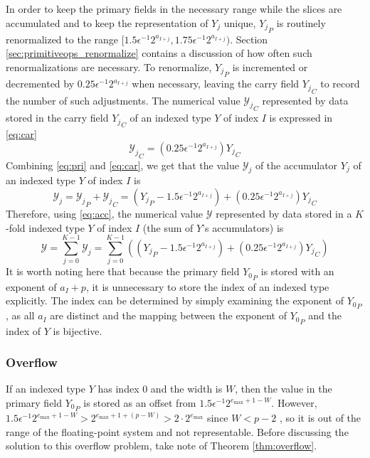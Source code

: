 \documentclass[12pt]{article}
\providecommand{\max}{\ensuremath{\text{max}}}
\theoremstyle{definition}
\numberwithin{equation}{section}
\numberwithin{figure}{section}
\begin{document}
      In order to keep the primary fields in the necessary range while the slices are accumulated and to keep the representation of $Y_j$ unique, ${Y_j}_P$ is routinely renormalized to the range $[1.5 \epsilon^{-1} 2^{a_{I + j}}, 1.75 \epsilon^{-1} 2^{a_{I + j}})$. Section \ref{sec:primitiveops_renormalize} contains a discussion of how often such renormalizations are necessary.
      To renormalize, ${Y_j}_P$ is incremented or decremented by $0.25 \epsilon^{-1} 2^{a_{I + j}}$ when necessary, leaving the carry field ${Y_j}_C$ to record the number of such adjustments.
      The numerical value ${\mathcal{Y}_j}_C$ represented by data stored in the carry field ${Y_j}_C$ of an indexed type $Y$ of index $I$ is expressed in \eqref{eq:car}
      \begin{equation}
        {\mathcal{Y}_j}_C = (0.25\epsilon^{-1}2^{a_{I + j}}){Y_j}_C
        \label{eq:car}
      \end{equation}
      Combining \eqref{eq:pri} and \eqref{eq:car}, we get that the value $\mathcal{Y}_j$ of the accumulator $Y_j$ of an indexed type $Y$ of index $I$ is
      \begin{equation}
        \mathcal{Y}_j = {\mathcal{Y}_j}_P + {\mathcal{Y}_j}_C = ({Y_j}_P - 1.5 \epsilon^{-1}2^{a_{I + j}}) + (0.25\epsilon^{-1}2^{a_{I + j}}){Y_j}_C
        \label{eq:acc}
      \end{equation}
      Therefore, using  \eqref{eq:acc}, the numerical value $\mathcal{Y}$ represented by data stored in a $K$-fold indexed type $Y$ of index $I$ (the sum of $Y$'s accumulators) is
      \begin{equation}
        \mathcal{Y} = \sum\limits_{j = 0}^{K - 1} \mathcal{Y}_j = \sum\limits_{j = 0}^{K - 1} (({Y_j}_P - 1.5 \epsilon^{-1}2^{a_{I + j}}) + (0.25\epsilon^{-1}2^{a_{I + j}}){Y_j}_C)
        \label{eq:indexedvalue}
      \end{equation}
      It is worth noting here that because the primary field ${Y_0}_P$ is stored with an exponent of $a_I + p$, it is unnecessary to store the index of an indexed type explicitly. The index can be determined by simply examining the exponent of ${Y_0}_P$, as all $a_I$ are distinct and the mapping between the exponent of ${Y_0}_P$ and the index of $Y$ is bijective.

    \subsubsection{Overflow}
      \label{sec:indexed_overflow}
      If an indexed type $Y$ has index 0 and the width is $W$, then the value in the primary field ${Y_0}_P$ is stored as an offset from $1.5\epsilon^{-1}2^{e_{\max} + 1 - W}$. However, $1.5\epsilon^{-1}2^{e_{\max} + 1 - W} > 2^{e_{\max} + 1 + (p - W)} > 2 \cdot 2^{e_{\max}}$ since $W < p - 2$ \cite{repsum}, so it is out of the range of the floating-point system and not representable. Before discussing the solution to this overflow problem, take note of Theorem \ref{thm:overflow}.
\end{document}
